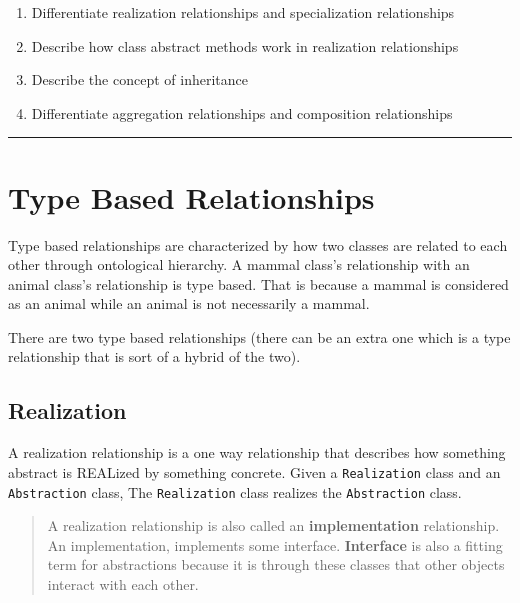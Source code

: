 \begin{enumerate}
\def\labelenumi{\arabic{enumi}.}
\tightlist
\item
  Differentiate realization relationships and specialization
  relationships
\item
  Describe how class abstract methods work in realization relationships
\item
  Describe the concept of inheritance
\item
  Differentiate aggregation relationships and composition relationships
\end{enumerate}

\begin{center}\rule{0.5\linewidth}{0.5pt}\end{center}

\section{Type Based
Relationships}\label{class-relationships.md__type-based-relationships}

Type based relationships are characterized by how two classes are
related to each other through ontological hierarchy. A mammal class's
relationship with an animal class's relationship is type based. That is
because a mammal is considered as an animal while an animal is not
necessarily a mammal.

There are two type based relationships (there can be an extra one which
is a type relationship that is sort of a hybrid of the two).

\subsection{Realization}\label{class-relationships.md__realization}

A realization relationship is a one way relationship that describes how
something abstract is REALized by something concrete. Given a
\texttt{Realization} class and an \texttt{Abstraction} class, The
\texttt{Realization} class realizes the \texttt{Abstraction} class.

\begin{quote}
A realization relationship is also called an \textbf{implementation}
relationship. An implementation, implements some interface.
\textbf{Interface} is also a fitting term for abstractions because it is
through these classes that other objects interact with each other.
\end{quote}

